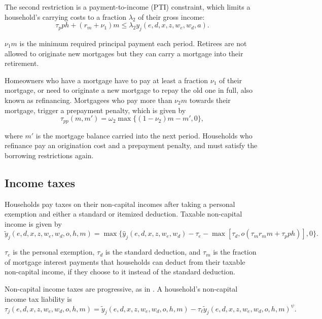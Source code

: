 \documentclass[parskip=full]{article}
\begin{document}
\noindent The second restriction is a payment-to-income (PTI) constraint, which limits a household's carrying costs to a fraction $\lambda_{2}$ of their gross income:
\begin{equation}
\label{eq:gds}
\tau_p ph + (r_m + \nu_1) m\leq \lambda_{2}y_{j}(e,d,x,z,w_{e},w_{d},a).
\end{equation}

\noindent $\nu_1 m$ is the minimum required principal payment each period. Retirees are not allowed to originate new mortgages but they can carry a mortgage into their retirement.

Homeowners who have a mortgage have to pay at least a fraction $\nu_1$ of their mortgage, or need to originate a new mortgage to repay the old one in full, also known as refinancing. Mortgagees who pay more than $\nu_2m$ towards their mortgage, trigger a prepayment penalty, which is given by
\begin{equation}
\label{eq:pp}
    \tau_{pp}(m,m') = \omega_2\max\{(1-\nu_2)m - m',0\},
\end{equation}

\noindent where $m'$ is the mortgage balance carried into the next period. Households who refinance pay an origination cost and a prepayment penalty, and must satisfy the borrowing restrictions again.

\subsection{Income taxes}
Households pay taxes on their non-capital incomes after taking a personal exemption and either a standard or itemized deduction. Taxable non-capital income is given by 
\begin{equation}
    \tilde{y}_{j}(e,d,x,z,w_{e},w_{d},o,h,m) = \max\{\hat{y}_{j}(e,d,x,z,w_{e},w_{d})-\tau_e-\max[\tau_d,o(\tau_m r_m m + \tau_p ph)],0\}.
\end{equation}

\noindent $\tau_e$ is the personal exemption, $\tau_d$ is the standard deduction, and $\tau_m$ is the fraction of mortgage interest payments that households can deduct from their taxable non-capital income, if they choose to it instead of the standard deduction. 

Non-capital income taxes are progressive, as in \citet{hsv-2020}. A household's non-capital income tax liability is
\begin{equation}
    \tau_{j}(e,d,x,z,w_{e},w_{d},o,h,m) = \tilde{y}_j(e,d,x,z,w_{e},w_{d},o,h,m) - \tau_\ell \tilde{y}_j(e,d,x,z,w_{e},w_{d},o,h,m)^\psi.
\end{equation}
\end{document}
